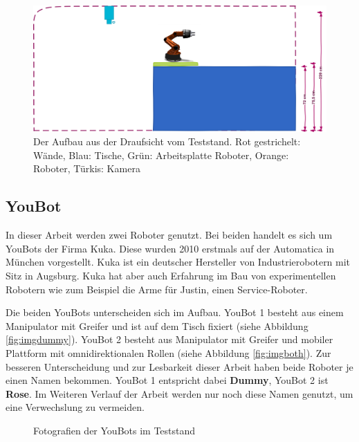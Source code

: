  
 
  \begin{figure}[h]
  	\centering
  	\includegraphics[scale=0.4]{fig/ZeichnungRaumH}   
  	\caption[Aufbau Teststand: Seitenansicht]{Der Aufbau aus der Draufsicht vom Teststand. Rot gestrichelt: Wände, Blau: Tische, Grün: Arbeitsplatte Roboter, Orange: Roboter, Türkis: Kamera}
  	\label{fig:basic-aufbau-teststandh}
  \end{figure}

\subsection{YouBot}
In dieser Arbeit werden zwei Roboter genutzt. Bei beiden handelt es sich um YouBots der Firma Kuka. Diese wurden 2010 erstmals auf der Automatica in München vorgestellt. Kuka ist ein deutscher Hersteller von Industrierobotern mit Sitz in Augsburg. Kuka hat aber auch Erfahrung im Bau von experimentellen Robotern wie zum Beispiel die Arme für Justin, einen Service-Roboter.

Die beiden YouBots unterscheiden sich im Aufbau. YouBot 1 besteht aus einem Manipulator mit Greifer und ist auf dem Tisch fixiert (siehe Abbildung \ref{fig:imgdummy}). YouBot 2 besteht aus Manipulator mit Greifer und mobiler Plattform mit omnidirektionalen Rollen (siehe Abbildung \ref{fig:imgboth}). Zur besseren Unterscheidung und zur Lesbarkeit dieser Arbeit haben beide Roboter je einen Namen bekommen. YouBot 1 entspricht dabei \textbf{Dummy}, YouBot 2 ist \textbf{Rose}. Im Weiteren Verlauf der Arbeit werden nur noch diese Namen genutzt, um eine Verwechslung zu vermeiden.

 \begin{figure}[H]
 	\centering
 	\hfill
 	\caption{Fotografien der YouBots im Teststand}
 	\label{fig:img}
 \end{figure}


